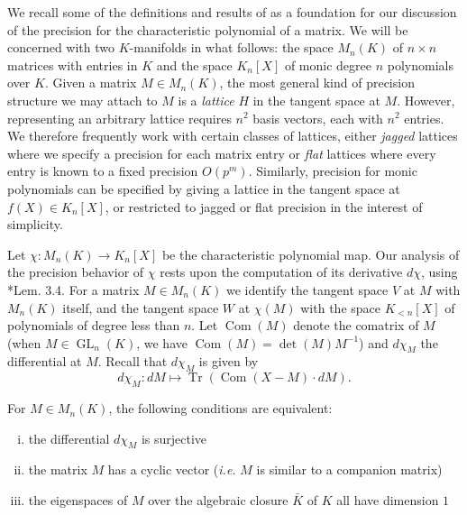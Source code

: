 \documentclass{sig-alternate-05-2015}
\DeclareMathOperator{\GL}{GL}
\DeclareMathOperator{\tr}{Tr}
\DeclareMathOperator{\com}{Com}
\begin{document}
We recall some of the definitions and results of \cite{caruso-roe-vaccon:14a}
as a foundation for our discussion of the precision for the characteristic polynomial
of a matrix.  We will be concerned with two $K$-manifolds in what follows:
the space $M_n(K)$ of $n \times n$ matrices with entries in $K$ and the space
$K_n[X]$ of monic degree $n$ polynomials over $K$.  Given a matrix $M \in M_n(K)$,
the most general kind of precision structure we may attach to $M$ is a
\emph{lattice} $H$ in the tangent space at $M$.  However, representing an
arbitrary lattice requires $n^2$ basis vectors, each with $n^2$ entries.  We therefore
frequently work with certain classes of lattices, either \emph{jagged} lattices
where we specify a precision for each matrix entry or \emph{flat} lattices where
every entry is known to a fixed precision $O(p^m)$.  Similarly, precision for
monic polynomials can be specified by giving a lattice in the tangent space
at $f(X) \in K_n[X]$, or restricted to jagged or flat precision in the interest
of simplicity.

Let $\chi : M_n(K) \to K_n[X]$ be the characteristic polynomial map.
Our analysis of the precision behavior of $\chi$ rests upon
the computation of its derivative $d\chi$, using \cite{caruso-roe-vaccon:14a}*{Lem. 3.4}.
For a matrix $M \in M_n(K)$ we identify the tangent space $V$
at $M$ with $M_n(K)$ itself, and the tangent space $W$ at $\chi(M)$ with
the space $K_{<n}[X]$ of polynomials of degree less than $n$.
Let $\com(M)$ denote the comatrix of $M$ (when $M \in \GL_n(K)$,
we have $\com(M) = \det(M) M^{-1}$) and $d\chi_M$ the differential at $M$.  Recall
that $d\chi_M$ is given by
\begin{equation} \label{eq:dchi}
d\chi_M: dM \mapsto \tr(\com(X-M) \cdot dM).
\end{equation}

\begin{prop}
\label{prop:surjectivity}
For $M \in M_n(K)$, the following conditions are equivalent:
\begin{enumerate}[(i)]
\renewcommand{\itemsep}{0pt}
\item \label{pt:surj} the differential $d\chi_M$ is surjective
\item \label{pt:cyc} the matrix $M$ has a cyclic vector (\emph{i.e.} $M$ is similar
to a companion matrix)
\item \label{pt:1d} the eigenspaces of $M$ over the algebraic
closure $\bar{K}$ of $K$ all have dimension $1$
\end{enumerate}
\end{prop}
\end{document}
